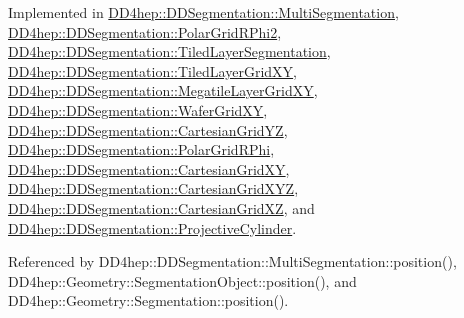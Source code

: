Implemented in \hyperlink{class_d_d4hep_1_1_d_d_segmentation_1_1_multi_segmentation_a45377b4442211346de8bea2edfeb1bf4}{D\+D4hep\+::\+D\+D\+Segmentation\+::\+Multi\+Segmentation}, \hyperlink{class_d_d4hep_1_1_d_d_segmentation_1_1_polar_grid_r_phi2_a53847924cad4067697490133e8024576}{D\+D4hep\+::\+D\+D\+Segmentation\+::\+Polar\+Grid\+R\+Phi2}, \hyperlink{class_d_d4hep_1_1_d_d_segmentation_1_1_tiled_layer_segmentation_acc4571d3ad2ac352f1cfb7fc45d1f2b7}{D\+D4hep\+::\+D\+D\+Segmentation\+::\+Tiled\+Layer\+Segmentation}, \hyperlink{class_d_d4hep_1_1_d_d_segmentation_1_1_tiled_layer_grid_x_y_af1018adc15e286afdc0abfa69a78f462}{D\+D4hep\+::\+D\+D\+Segmentation\+::\+Tiled\+Layer\+Grid\+XY}, \hyperlink{class_d_d4hep_1_1_d_d_segmentation_1_1_megatile_layer_grid_x_y_a7ec0272831c54892acf762c97a857083}{D\+D4hep\+::\+D\+D\+Segmentation\+::\+Megatile\+Layer\+Grid\+XY}, \hyperlink{class_d_d4hep_1_1_d_d_segmentation_1_1_wafer_grid_x_y_a1682e14c303ca45e402a1aa648f58558}{D\+D4hep\+::\+D\+D\+Segmentation\+::\+Wafer\+Grid\+XY}, \hyperlink{class_d_d4hep_1_1_d_d_segmentation_1_1_cartesian_grid_y_z_a830b4d74e64bc4dabf7fc763176affd1}{D\+D4hep\+::\+D\+D\+Segmentation\+::\+Cartesian\+Grid\+YZ}, \hyperlink{class_d_d4hep_1_1_d_d_segmentation_1_1_polar_grid_r_phi_af010e7834967170f9f7ea5101b8da1a7}{D\+D4hep\+::\+D\+D\+Segmentation\+::\+Polar\+Grid\+R\+Phi}, \hyperlink{class_d_d4hep_1_1_d_d_segmentation_1_1_cartesian_grid_x_y_a699a4abe55b46d29e5a0d43fcb76b81c}{D\+D4hep\+::\+D\+D\+Segmentation\+::\+Cartesian\+Grid\+XY}, \hyperlink{class_d_d4hep_1_1_d_d_segmentation_1_1_cartesian_grid_x_y_z_ad8d64eb704f1d54553fb9ed24f4bbde4}{D\+D4hep\+::\+D\+D\+Segmentation\+::\+Cartesian\+Grid\+X\+YZ}, \hyperlink{class_d_d4hep_1_1_d_d_segmentation_1_1_cartesian_grid_x_z_a8ed53ce402a08aedea07c6a015abb0e8}{D\+D4hep\+::\+D\+D\+Segmentation\+::\+Cartesian\+Grid\+XZ}, and \hyperlink{class_d_d4hep_1_1_d_d_segmentation_1_1_projective_cylinder_a0795705365655c869e455bab1efcfe3b}{D\+D4hep\+::\+D\+D\+Segmentation\+::\+Projective\+Cylinder}.



Referenced by D\+D4hep\+::\+D\+D\+Segmentation\+::\+Multi\+Segmentation\+::position(), D\+D4hep\+::\+Geometry\+::\+Segmentation\+Object\+::position(), and D\+D4hep\+::\+Geometry\+::\+Segmentation\+::position().

\hypertarget{class_d_d4hep_1_1_d_d_segmentation_1_1_segmentation_ac4b0fad36827310fd144843d77e39d71}{}\label{class_d_d4hep_1_1_d_d_segmentation_1_1_segmentation_ac4b0fad36827310fd144843d77e39d71} 
